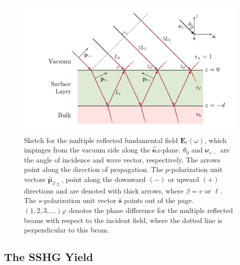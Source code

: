 \begin{figure}[t]
\centering 
\includegraphics[scale=0.6]{content/figures/diag-3layer_MR_1w}
\caption[Sketch for the multiple reflected, $1\omega$ incoming field.]
{Sketch for the multiple reflected fundamental field
$\mathbf{E}_{\ell}(\omega)$, which impinges from the vacuum side along the
$\hat{\boldsymbol{\kappa}}z$-plane. $\theta_{0}$ and $\boldsymbol{\nu}_{v-}$ are
the angle of incidence and wave vector, respectively. The arrows point along the
direction of propagation. The $p$-polarization unit vectors
$\hat{\mathbf{p}}_{\beta\pm}$, point along the downward $(-)$ or upward $(+)$
directions and are denoted with thick arrows, where $\beta = v$ or $\ell$. The
$s$-polarization unit vector $\hat{\mathbf{s}}$ points out of the page.
$(1,2,3,\ldots)\varphi$ denotes the phase difference for the multiple reflected
beams with respect to the incident field, where the dotted line is perpendicular
to this beam.}
\label{fig:MR3layer1w}
\end{figure}



\subsection{The SSHG Yield}

